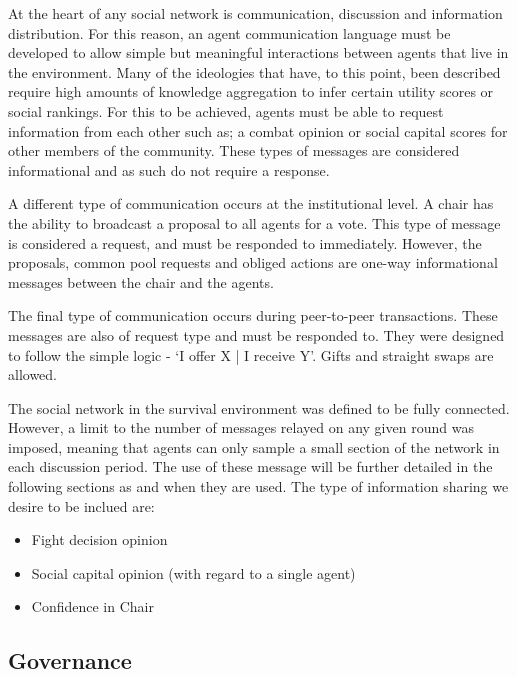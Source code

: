 
At the heart of any social network is communication, discussion and information distribution. For this reason, an agent communication language must be developed to allow simple but meaningful interactions between agents that live in the environment. Many of the ideologies that have, to this point, been described require high amounts of knowledge aggregation to infer certain utility scores or social rankings. For this to be achieved, agents must be able to request information from each other such as; a combat opinion or social capital scores for other members of the community. These types of messages are considered informational and as such do not require a response. 

A different type of communication occurs at the institutional level. A chair has the ability to broadcast a proposal to all agents for a vote. This type of message is considered a request, and must be responded to immediately. However, the proposals, common pool requests and obliged actions are one-way informational messages between the chair and the agents. 

The final type of communication occurs during peer-to-peer transactions. These messages are also of request type and must be responded to. They were designed to follow the simple logic - `I offer X | I receive Y'. Gifts and straight swaps are allowed. 

The social network in the survival environment was defined to be fully connected. However, a limit to the number of messages relayed on any given round was imposed, meaning that agents can only sample a small section of the network in each discussion period. The use of these message will be further detailed in the following sections as and when they are used. The type of information sharing we desire to be inclued are:

\begin{itemize}
    \item Fight decision opinion 
    \item Social capital opinion (with regard to a single agent) 
    \item Confidence in Chair
\end{itemize}

\subsection{Governance}\label{sec: gov}

